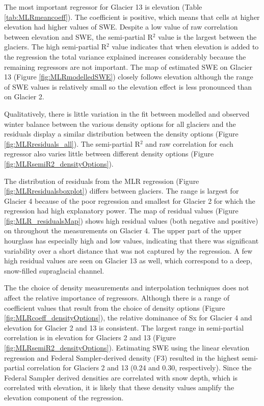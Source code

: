 \documentclass{sfuthesis}
\begin{document}
The most important regressor for Glacier 13 is elevation (Table \ref{tab:MLRmeancoeff}). The coefficient is positive, which means that cells at higher elevation had higher values of SWE. Despite a low value of raw correlation between elevation and SWE, the semi-partial R$^2$ value is  the largest between the glaciers. The high semi-partial R$^2$ value indicates that when elevation is added to the regression the total variance explained increases considerably because the remaining regressors are not important. The map of estimated SWE on Glacier 13 (Figure \ref{fig:MLRmodelledSWE}) closely follows elevation although the range of SWE values is relatively small so the elevation effect is less pronounced than on Glacier 2. 

Qualitatively, there is little variation in the fit between modelled and observed winter balance between the various density options for all glaciers and the residuals display a similar distribution between the density options (Figure \ref{fig:MLRresiduals_all}). The semi-partial R$^2$ and raw correlation for each regressor also varies little between different density options (Figure \ref{fig:MLRsemiR2_densityOptions}).

The distribution of residuals from the MLR regression (Figure \ref{fig:MLRresidualsboxplot}) differs between glaciers. The range is largest for Glacier 4 because of the poor regression and smallest for Glacier 2 for which the regression had high explanatory power. The map of residual values (Figure \ref{fig:MLR_residualsMap}) shows high residual values (both negative and positive) on throughout the measurements on Glacier 4. The upper part of the upper hourglass has especially high and low values, indicating that there was significant variability over a short distance that was not captured by the regression. A few high residual values are seen on Glacier 13 as well, which correspond to a deep, snow-filled supraglacial channel.

The the choice of density measurements and interpolation techniques does not affect the relative importance of regressors. Although there is a range of coefficient values that result from the choice of density options (Figure \ref{fig:MLRcoeff_densityOptions}), the relative dominance of Sx for Glacier 4 and elevation for Glacier 2 and 13 is consistent. The largest range in semi-partial correlation is in elevation for Glaciers 2 and 13 (Figure \ref{fig:MLRsemiR2_densityOptions}). Estimating SWE using the linear elevation regression and Federal Sampler-derived density (F3) resulted in the highest semi-partial correlation for Glaciers 2 and 13 (0.24 and 0.30, respectively). Since the Federal Sampler derived densities are correlated with snow depth, which is correlated with elevation, it is likely that these density values amplify the elevation component of the regression. 
\end{document}
